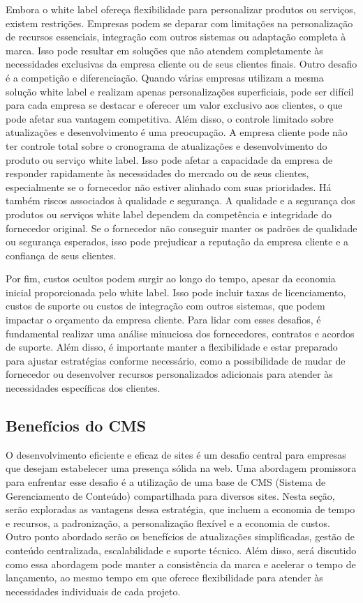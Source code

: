 \documentclass[12pt,twoside,english,brazilian]{article}
\begin{document}
Embora o white label ofereça flexibilidade para personalizar produtos ou serviços, existem restrições. Empresas podem se deparar com limitações na personalização de recursos essenciais, integração com outros sistemas ou adaptação completa à marca. Isso pode resultar em soluções que não atendem completamente às necessidades exclusivas da empresa cliente ou de seus clientes finais. Outro desafio é a competição e diferenciação. Quando várias empresas utilizam a mesma solução white label e realizam apenas personalizações superficiais, pode ser difícil para cada empresa se destacar e oferecer um valor exclusivo aos clientes, o que pode afetar sua vantagem competitiva. Além disso, o controle limitado sobre atualizações e desenvolvimento é uma preocupação. A empresa cliente pode não ter controle total sobre o cronograma de atualizações e desenvolvimento do produto ou serviço white label. Isso pode afetar a capacidade da empresa de responder rapidamente às necessidades do mercado ou de seus clientes, especialmente se o fornecedor não estiver alinhado com suas prioridades. Há também riscos associados à qualidade e segurança. A qualidade e a segurança dos produtos ou serviços white label dependem da competência e integridade do fornecedor original. Se o fornecedor não conseguir manter os padrões de qualidade ou segurança esperados, isso pode prejudicar a reputação da empresa cliente e a confiança de seus clientes.

Por fim, custos ocultos podem surgir ao longo do tempo, apesar da economia inicial proporcionada pelo white label. Isso pode incluir taxas de licenciamento, custos de suporte ou custos de integração com outros sistemas, que podem impactar o orçamento da empresa cliente. Para lidar com esses desafios, é fundamental realizar uma análise minuciosa dos fornecedores, contratos e acordos de suporte. Além disso, é importante manter a flexibilidade e estar preparado para ajustar estratégias conforme necessário, como a possibilidade de mudar de fornecedor ou desenvolver recursos personalizados adicionais para atender às necessidades específicas dos clientes.

\subsection{Benefícios do CMS}
O desenvolvimento eficiente e eficaz de sites é um desafio central para empresas que desejam estabelecer uma presença sólida na web. Uma abordagem promissora para enfrentar esse desafio é a utilização de uma base de CMS (Sistema de Gerenciamento de Conteúdo) compartilhada para diversos sites. Nesta seção, serão exploradas as vantagens dessa estratégia, que incluem a economia de tempo e recursos, a padronização, a personalização flexível e a economia de custos. Outro ponto abordado serão os benefícios de atualizações simplificadas, gestão de conteúdo centralizada, escalabilidade e suporte técnico. Além disso, será discutido como essa abordagem pode manter a consistência da marca e acelerar o tempo de lançamento, ao mesmo tempo em que oferece flexibilidade para atender às necessidades individuais de cada projeto.
\end{document}
